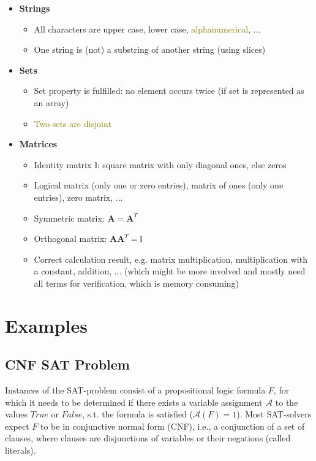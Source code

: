 \documentclass{article}
\newcommand{\mat}[1]{\mathbf{#1}}
\begin{document}
\begin{itemize}
\begin{itemize}
    \end{itemize}
    \item \textbf{Strings}
    \begin{itemize}
        \item All characters are upper case, lower case, \textcolor{olive}{alphanumerical}, ...
        \item One string is (not) a substring of another string (using slices)
    \end{itemize}
    \item \textbf{Sets}
    \begin{itemize}
        \item Set property is fulfilled: no element occurs twice (if set is represented as an array)
        \item \textcolor{olive}{Two sets are disjoint}
    \end{itemize}
    \item \textbf{Matrices}
    \begin{itemize}
        \item Identity matrix $\mathbb{I}$: square matrix with only diagonal ones, else zeros
        \item Logical matrix (only one or zero entries), matrix of ones (only one entries), zero matrix, ...
        \item Symmetric matrix: $\mat{A} = \mat{A}^T$
        \item Orthogonal matrix: $\mat{A}\mat{A}^T = \mathbb{I}$
        \item Correct calculation result, e.g. matrix multiplication, multiplication with a constant, addition, ... (which might be more involved and mostly need all terms for verification, which is memory consuming)
    \end{itemize}
\end{itemize}

\section{Examples}\label{sec:examples}

\subsection{CNF SAT Problem}\label{subsec:cnfsat}
Instances of the SAT-problem consist of a propositional logic formula $F$, for which it needs to be determined if there exists a variable assignment $\mathcal{A}$ to the values $True$ or $False$, s.t. the formula is satisfied ($\mathcal{A}(F) = 1$). Most SAT-solvers expect $F$ to be in conjunctive normal form (CNF), i.e., a conjunction of a set of clauses, where clauses are disjunctions of variables or their negations (called literals).
\end{document}
